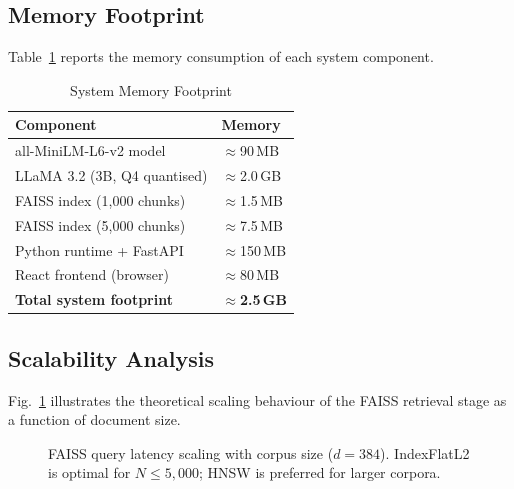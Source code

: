 \documentclass[conference]{IEEEtran}
\begin{document}
\subsection{Memory Footprint}
Table~\ref{tab:memory} reports the memory consumption of each system
component.

\begin{table}[h]
\caption{System Memory Footprint}
\label{tab:memory}
\centering
\begin{tabular}{ll}
\toprule
\textbf{Component} & \textbf{Memory} \\
\midrule
all-MiniLM-L6-v2 model          & $\approx$90\,MB  \\
LLaMA 3.2 (3B, Q4 quantised)    & $\approx$2.0\,GB \\
FAISS index (1,000 chunks)       & $\approx$1.5\,MB \\
FAISS index (5,000 chunks)       & $\approx$7.5\,MB \\
Python runtime + FastAPI         & $\approx$150\,MB \\
React frontend (browser)         & $\approx$80\,MB  \\
\textbf{Total system footprint}  & $\approx$\textbf{2.5\,GB} \\
\bottomrule
\end{tabular}
\end{table}

\subsection{Scalability Analysis}
Fig.~\ref{fig:scale} illustrates the theoretical scaling behaviour of
the FAISS retrieval stage as a function of document size.

\begin{figure}[h]
\centering
{}
\caption{FAISS query latency scaling with corpus size ($d{=}384$).
         IndexFlatL2 is optimal for $N{\leq}5{,}000$; HNSW is preferred
         for larger corpora.}
\label{fig:scale}
\end{figure}
\end{document}
